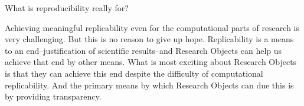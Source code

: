	What is reproducibility really for?
	
		Achieving meaningful replicability even for the computational parts of research is very challenging.
		But this is no reason to give up hope.  
		Replicability is a means to an end--justification of scientific results--and Research Objects can help us achieve that end by other means.
		What is most exciting about Research Objects is that they can achieve this end despite the difficulty of computational replicability.
		And the primary means by which Research Objects can due this is by providing transparency.